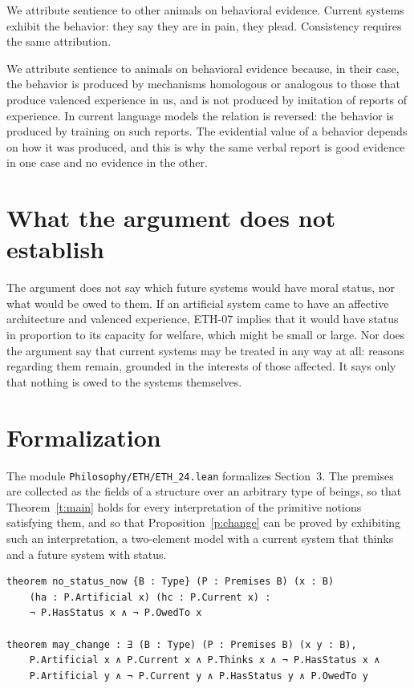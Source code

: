 \documentclass{situationist-preprint}
\begin{document}
\begin{objection}
We attribute sentience to other animals on behavioral evidence. Current systems exhibit the behavior: they say they are in pain, they plead. Consistency requires the same attribution.
\end{objection}

\begin{reply}
We attribute sentience to animals on behavioral evidence because, in their case, the behavior is produced by mechanisms homologous or analogous to those that produce valenced experience in us, and is not produced by imitation of reports of experience. In current language models the relation is reversed: the behavior is produced by training on such reports. The evidential value of a behavior depends on how it was produced, and this is why the same verbal report is good evidence in one case and no evidence in the other.
\end{reply}

\section{What the argument does not establish}

The argument does not say which future systems would have moral status, nor what would be owed to them. If an artificial system came to have an affective architecture and valenced experience, ETH-07 implies that it would have status in proportion to its capacity for welfare, which might be small or large. Nor does the argument say that current systems may be treated in any way at all: reasons regarding them remain, grounded in the interests of those affected. It says only that nothing is owed to the systems themselves.

\section{Formalization}

The module \nolinkurl{Philosophy/ETH/ETH_24.lean} formalizes Section~3. The premises are collected as the fields of a structure over an arbitrary type of beings, so that Theorem~\ref{t:main} holds for every interpretation of the primitive notions satisfying them, and so that Proposition~\ref{p:change} can be proved by exhibiting such an interpretation, a two-element model with a current system that thinks and a future system with status.

\begin{lstlisting}
theorem no_status_now {B : Type} (P : Premises B) (x : B)
    (ha : P.Artificial x) (hc : P.Current x) :
    ¬ P.HasStatus x ∧ ¬ P.OwedTo x

theorem may_change : ∃ (B : Type) (P : Premises B) (x y : B),
    P.Artificial x ∧ P.Current x ∧ P.Thinks x ∧ ¬ P.HasStatus x ∧
    P.Artificial y ∧ ¬ P.Current y ∧ P.HasStatus y ∧ P.OwedTo y
\end{lstlisting}
\end{document}
